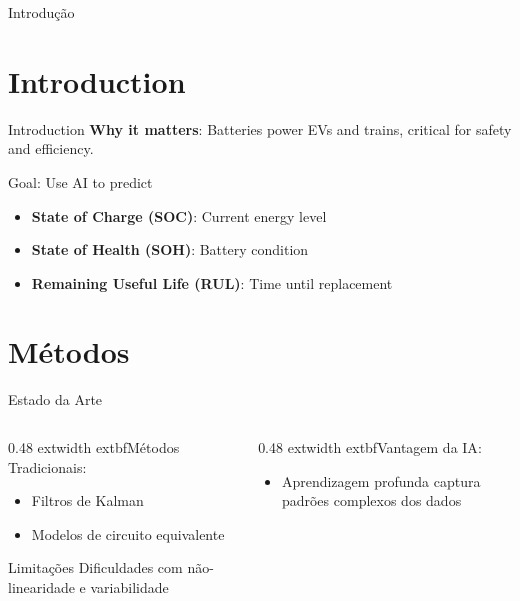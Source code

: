\begin{frame}{Introdução}
\begin{frame}
\section{Introduction}
\begin{frame}{Introduction}
  \textbf{Why it matters}: Batteries power EVs and trains, critical for safety and efficiency.
  
  \vspace{0.5cm}
  
  \begin{block}{Goal: Use AI to predict}
    \begin{itemize}
      \item \textbf{State of Charge (SOC)}: Current energy level
      \item \textbf{State of Health (SOH)}: Battery condition
      \item \textbf{Remaining Useful Life (RUL)}: Time until replacement
    \end{itemize}
  \end{block}
  
  \vspace{0.5cm}
  
  \centering
\end{frame}

\section{Métodos}
\begin{frame}{Estado da Arte}
  \begin{columns}
    \begin{column}{0.48	extwidth}
      	extbf{Métodos Tradicionais}:
      \begin{itemize}
        \item Filtros de Kalman
        \item Modelos de circuito equivalente
      \end{itemize}
      
      \begin{alertblock}{Limitações}
        Dificuldades com não-linearidade e variabilidade
      \end{alertblock}
    \end{column}
    \begin{column}{0.48	extwidth}
      	extbf{Vantagem da IA}:
      \begin{itemize}
        \item Aprendizagem profunda captura padrões complexos dos dados
      \end{itemize}
      

\end{column}
\end{columns}
\end{frame}
\end{frame}
\end{frame}
